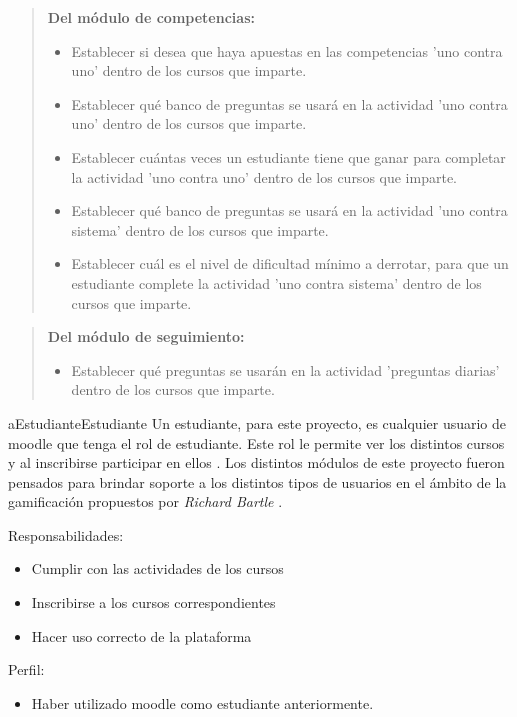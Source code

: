     \begin{quote}
    {\bf Del módulo de competencias:}
        \begin{itemize}
        \item Establecer si desea que haya apuestas en las competencias 'uno contra uno' dentro de los cursos que imparte.
        \item Establecer qué banco de preguntas se usará en la actividad 'uno contra uno' dentro de los cursos que imparte.
        \item Establecer cuántas veces un estudiante tiene que ganar para completar la actividad 'uno contra uno' dentro de los cursos que imparte.
        \item Establecer qué banco de preguntas se usará en la actividad 'uno contra sistema' dentro de los cursos que imparte.
        \item Establecer cuál es el nivel de dificultad mínimo a derrotar, para que un estudiante complete la actividad 'uno contra sistema' dentro de los cursos que imparte.
        \end{itemize}
    \end{quote}


    \begin{quote}
    {\bf Del módulo de seguimiento:}
        \begin{itemize}
        \item Establecer qué preguntas se usarán en la actividad 'preguntas diarias' dentro de los cursos que imparte.
        \end{itemize}
    \end{quote}


    \begin{actor}{aEstudiante}{Estudiante}{%
    Un estudiante, para este proyecto, es cualquier usuario de moodle que tenga el rol de
    estudiante. Este rol le permite ver los distintos cursos y al inscribirse participar
    en ellos \cite{MoodleRolEstudiante}. Los distintos módulos de este proyecto fueron pensados
    para brindar soporte a los distintos tipos de usuarios en el ámbito de la gamificación
    propuestos por {\it Richard Bartle} \cite{BartleUsuarios}.\\}

    \item[Responsabilidades:] \hfill
        \begin{itemize}
        \item Cumplir con las actividades de los cursos
        \item Inscribirse a los cursos correspondientes
        \item Hacer uso correcto de la plataforma
        \end{itemize}

    \item[Perfil:] \hfill
        \begin{itemize}
        \item Haber utilizado moodle como estudiante anteriormente.
        \end{itemize}
    \end{actor}

